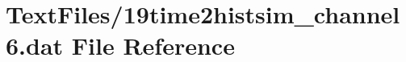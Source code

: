 \hypertarget{19time2histsim__channel6_8dat}{}\section{Text\+Files/19time2histsim\+\_\+channel6.dat File Reference}
\label{19time2histsim__channel6_8dat}
